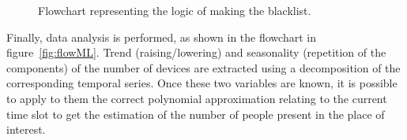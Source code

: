 \begin{figure}
\begin{minipage}[b]{8.5cm}
\caption{Flowchart representing the logic of making the blacklist.}
\label{fig:flowblacklist}
\end{minipage}
\end{figure}

Finally, data analysis is performed, as shown in the flowchart in figure~\ref{fig:flowML}. Trend (raising/lowering) and seasonality (repetition of the components) of the number of devices are extracted using a decomposition of the corresponding temporal series. Once these two variables are known, it is possible to apply to them the correct polynomial approximation relating to the current time slot to get the estimation of the number of people present in the place of interest.



